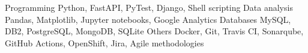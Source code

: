 %
%
%

    \begin{keywords}
        \keywordsentry
            {Programming}
            {
                Python,
                FastAPI,
                PyTest,
                Django,
                Shell scripting
            }
        \keywordsentry
            {Data analysis}
            {
                Pandas,
                Matplotlib,
                Jupyter notebooks,
                Google Analytics
            }
        \keywordsentry
            {Databases}
            {
                MySQL,
                DB2,
                PostgreSQL,
                MongoDB,
                SQLite
            }
        \keywordsentry
            {Others}
            {
            	Docker,
                Git,
                Travis CI,
                Sonarqube,
                GitHub Actions,
                OpenShift,
                Jira,
                Agile methodologies
            }
    \end{keywords}

